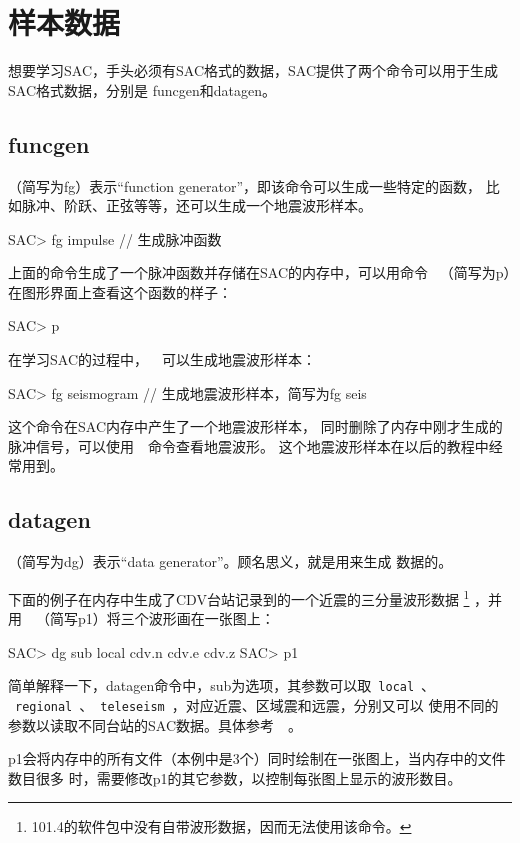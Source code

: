 \section{样本数据}

想要学习SAC，手头必须有SAC格式的数据，SAC提供了两个命令可以用于生成SAC格式数据，分别是
funcgen和datagen。

\subsection{funcgen}
（简写为fg）表示``function generator''，即该命令可以生成一些特定的函数，
比如脉冲、阶跃、正弦等等，还可以生成一个地震波形样本。
\begin{SACCode}
SAC> fg impulse         // 生成脉冲函数
\end{SACCode}
上面的命令生成了一个脉冲函数并存储在SAC的内存中，可以用命令~
（简写为p）在图形界面上查看这个函数的样子：
\begin{SACCode}
SAC> p
\end{SACCode}
在学习SAC的过程中，~~可以生成地震波形样本：
\begin{SACCode}
SAC> fg seismogram      // 生成地震波形样本，简写为fg seis
\end{SACCode}
这个命令在SAC内存中产生了一个地震波形样本，
同时删除了内存中刚才生成的脉冲信号，可以使用~~命令查看地震波形。
这个地震波形样本在以后的教程中经常用到。

\subsection{datagen}
（简写为dg）表示``data generator''。顾名思义，就是用来生成
数据的。

下面的例子在内存中生成了CDV台站记录到的一个近震的三分量波形数据
\footnote{101.4的软件包中没有自带波形数据，因而无法使用该命令。}
，并用~~（简写p1）将三个波形画在一张图上：
\begin{SACCode}
SAC> dg sub local cdv.n cdv.e cdv.z
SAC> p1
\end{SACCode}
简单解释一下，datagen命令中，sub为选项，其参数可以取~\verb+local+~、
~\verb+regional+~、~\verb+teleseism+~，对应近震、区域震和远震，分别又可以
使用不同的参数以读取不同台站的SAC数据。具体参考~~。

p1会将内存中的所有文件（本例中是3个）同时绘制在一张图上，当内存中的文件数目很多
时，需要修改p1的其它参数，以控制每张图上显示的波形数目。
